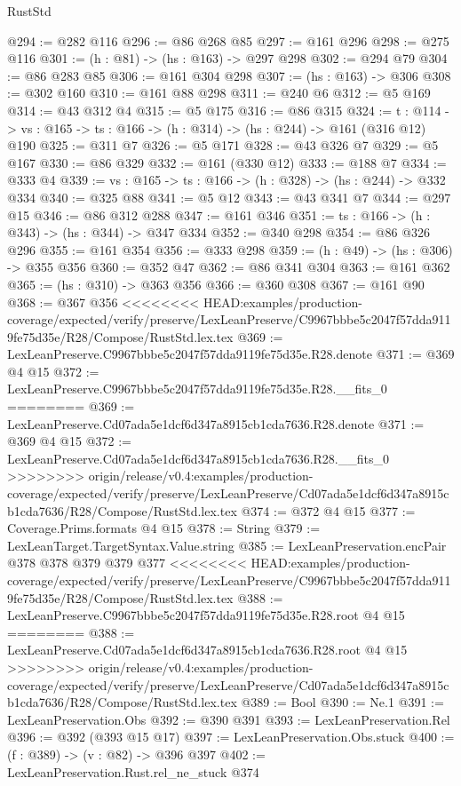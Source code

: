 \begin{lexlean}{RustStd}
\begin{coremodule}
{\begin{coremodule}
@294 := @282 @116
@296 := @86 @268 @85
@297 := @161 @296
@298 := @275 @116
@301 := (h : @81) -> (hs : @163) -> @297 @298
@302 := @294 @79
@304 := @86 @283 @85
@306 := @161 @304 @298
@307 := (hs : @163) -> @306
@308 := @302 @160
@310 := @161 @88 @298
@311 := @240 @6
@312 := @5 @169
@314 := @43 @312 @4
@315 := @5 @175
@316 := @86 @315
@324 := {t : @114} ->
  {vs : @165} -> {ts : @166} -> (h : @314) -> (hs : @244) -> @161 (@316 @12) @190
@325 := @311 @7
@326 := @5 @171
@328 := @43 @326 @7
@329 := @5 @167
@330 := @86 @329
@332 := @161 (@330 @12)
@333 := @188 @7
@334 := @333 @4
@339 := {vs : @165} -> {ts : @166} -> (h : @328) -> (hs : @244) -> @332 @334
@340 := @325 @88
@341 := @5 @12
@343 := @43 @341 @7
@344 := @297 @15
@346 := @86 @312 @288
@347 := @161 @346
@351 := {ts : @166} -> (h : @343) -> (hs : @344) -> @347 @334
@352 := @340 @298
@354 := @86 @326 @296
@355 := @161 @354
@356 := @333 @298
@359 := (h : @49) -> (hs : @306) -> @355 @356
@360 := @352 @47
@362 := @86 @341 @304
@363 := @161 @362
@365 := (hs : @310) -> @363 @356
@366 := @360 @308
@367 := @161 @90
@368 := @367 @356
<<<<<<<< HEAD:examples/production-coverage/expected/verify/preserve/LexLeanPreserve/C9967bbbe5c2047f57dda9119fe75d35e/R28/Compose/RustStd.lex.tex
@369 := LexLeanPreserve.C9967bbbe5c2047f57dda9119fe75d35e.R28.denote
@371 := @369 @4 @15
@372 := LexLeanPreserve.C9967bbbe5c2047f57dda9119fe75d35e.R28.__fits_0
========
@369 := LexLeanPreserve.Cd07ada5e1dcf6d347a8915cb1cda7636.R28.denote
@371 := @369 @4 @15
@372 := LexLeanPreserve.Cd07ada5e1dcf6d347a8915cb1cda7636.R28.__fits_0
>>>>>>>> origin/release/v0.4:examples/production-coverage/expected/verify/preserve/LexLeanPreserve/Cd07ada5e1dcf6d347a8915cb1cda7636/R28/Compose/RustStd.lex.tex
@374 := @372 @4 @15
@377 := Coverage.Prims.formats @4 @15
@378 := String
@379 := LexLeanTarget.TargetSyntax.Value.string
@385 := LexLeanPreservation.encPair @378 @378 @379 @379 @377
<<<<<<<< HEAD:examples/production-coverage/expected/verify/preserve/LexLeanPreserve/C9967bbbe5c2047f57dda9119fe75d35e/R28/Compose/RustStd.lex.tex
@388 := LexLeanPreserve.C9967bbbe5c2047f57dda9119fe75d35e.R28.root @4 @15
========
@388 := LexLeanPreserve.Cd07ada5e1dcf6d347a8915cb1cda7636.R28.root @4 @15
>>>>>>>> origin/release/v0.4:examples/production-coverage/expected/verify/preserve/LexLeanPreserve/Cd07ada5e1dcf6d347a8915cb1cda7636/R28/Compose/RustStd.lex.tex
@389 := Bool
@390 := Ne.{1}
@391 := LexLeanPreservation.Obs
@392 := @390 @391
@393 := LexLeanPreservation.Rel
@396 := @392 (@393 @15 @17)
@397 := LexLeanPreservation.Obs.stuck
@400 := (f : @389) -> (v : @82) -> @396 @397
@402 := LexLeanPreservation.Rust.rel_ne_stuck @374

\end{coremodule}}
\end{coremodule}
\end{lexlean}
